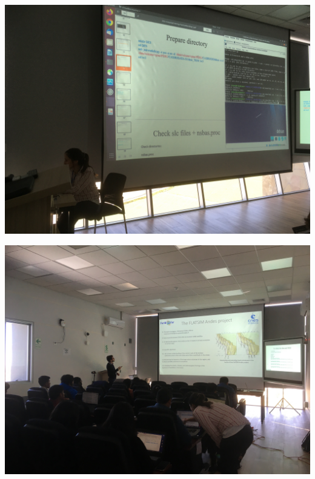 \documentclass{beamer}
\begin{document}
\begin{frame}
 
 \includegraphics[width=1\linewidth]{images/CoursLea.jpeg}
 
\end{frame}


\begin{frame}
 
 \includegraphics[width=1\linewidth]{images/CoursBertrand.jpeg}
 
\end{frame}
\end{document}

